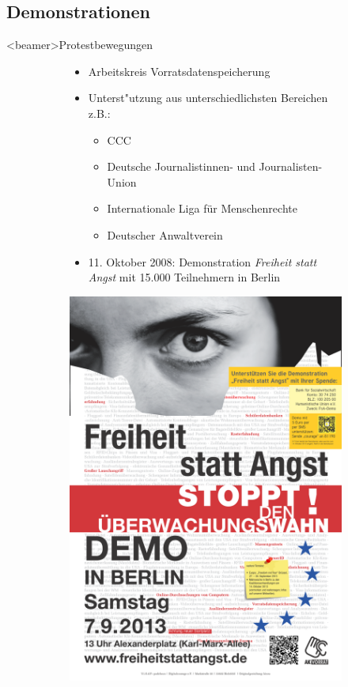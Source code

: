   \subsection*{Demonstrationen}
    \begin{frame}<beamer>{Protestbewegungen}
      \begin{figure}
        \begin{subfigure}[b]{0.5\textwidth}
          \begin{itemize}
            \item Arbeitskreis Vorratsdatenspeicherung
            \item Unterst"utzung aus unterschiedlichsten Bereichen z.B.:
              \begin{itemize}
                \item CCC
                \item Deutsche Journalistinnen- und Journalisten-Union
                \item Internationale Liga für Menschenrechte
                \item Deutscher Anwaltverein
              \end{itemize}
            \item 11. Oktober 2008: Demonstration {\em Freiheit statt Angst} mit 15.000 Teilnehmern in Berlin
          \end{itemize}
        \end{subfigure}
        \begin{subfigure}[b]{0.3\textwidth}
          \includegraphics[scale=0.05]{sections/img/freiheit_statt_angst.png}

\end{subfigure}
\end{figure}
\end{frame}
